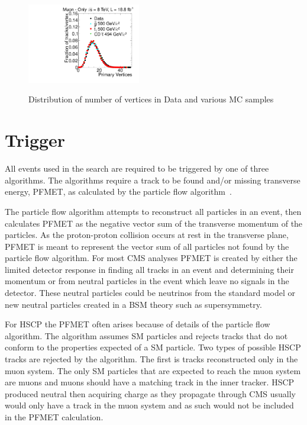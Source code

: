 \begin{figure}
  \begin{center}
      \includegraphics[clip=true, trim=0.0cm 0cm 3.0cm 0cm, width=0.44\textwidth]{figures/muonly/Selection_Comp_Signal_8TeV_PV_BS}
      \renewcommand\baselinestretch{1}\caption[Gluino1200f100 System Pt vs MET]
        {Distribution of number of vertices in Data and various MC samples
        }
      \renewcommand\baselinestretch{\@spacing}
      \label{fig:PV}
  \end{center}
\end{figure}

\section{Trigger \label{sec:trigger}}
All events used in the search are required to be triggered by one of three algorithms. The algorithms require a track to be found
and/or missing transverse energy, PFMET, as calculated by the particle flow algorithm~\cite{CMS-PAS-JME-10-003}. 

The particle flow algorithm attempts
to reconstruct all particles in an event, then calculates PFMET as the negative vector sum of the transverse momentum of the particles. As the proton-proton collision occurs
at rest in the transverse plane, PFMET is meant to represent the vector sum of all particles not found by the particle flow algorithm. For most CMS analyses PFMET is created
by either the limited detector response in finding all tracks in an event and determining their momentum or from neutral particles in the event which leave no signals
in the detector. These neutral particles could be neutrinos from the standard model or new neutral particles created in a BSM theory such as supersymmetry. 

For HSCP the
PFMET often arises because of details of the particle flow algorithm. The algorithm assumes SM particles and rejects tracks that do not conform to the properties expected
of a SM particle. Two types of possible HSCP tracks are rejected by the algorithm. The first is tracks reconstructed only in the muon system. The only SM particles that
are expected to reach the muon system are muons and muons should have a matching track in the inner tracker. HSCP produced neutral then acquiring charge as they propagate
through CMS usually would only have a track in the muon system and as such would not be included in the PFMET calculation. 

